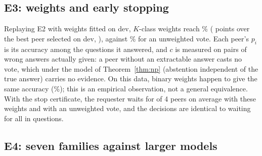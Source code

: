 \documentclass[11pt]{article}
\theoremstyle{definition}
\theoremstyle{remark}
\begin{document}
\subsection{E3: weights and early stopping}\label{sec:e3}
Replaying E2 with weights fitted on dev, $K$-class weights reach \eThreeKclassAcc\% (\eThreeKclassGain{}
points over the best peer selected on dev, \eThreeKclassGainCI), against \eThreeVoteAcc\% for an unweighted vote. Each
peer's $p_i$ is its accuracy among the questions it answered, and $c$ is measured on pairs of wrong answers
actually given: a peer without an extractable answer casts no vote, which under the model of
Theorem~\ref{thm:np} (abstention independent of the true answer) carries no evidence. On this data, binary
weights happen to give the same accuracy (\eThreeBinaryAcc\%); this is an empirical observation, not a
general equivalence. With the stop certificate, the requester waits for \eThreeKclassWaited{} of 4 peers on
average with these weights and \eThreeVoteWaited{} with an unweighted vote, and the decisions are identical
to waiting for all in \eThreeKclassSame{} questions.

\subsection{E4: seven families against larger models}\label{sec:e4}
\end{document}

